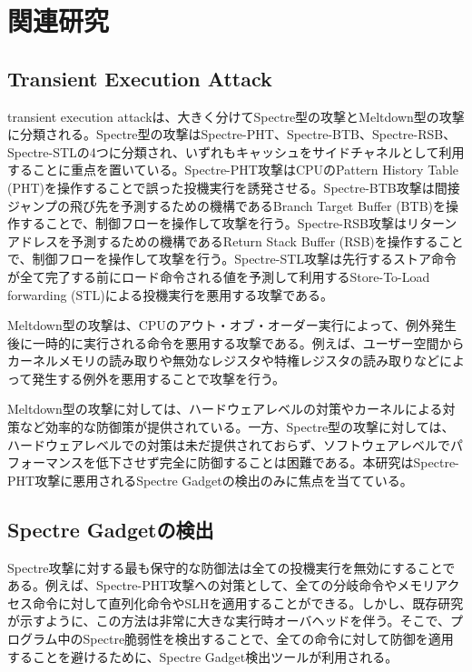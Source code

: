 \section{関連研究}
\subsection{Transient Execution Attack}
transient execution attackは、大きく分けてSpectre型の攻撃とMeltdown型の攻撃に分類される。Spectre型の攻撃はSpectre-PHT\cite{8835233}、Spectre-BTB\cite{8835233}、Spectre-RSB\cite{220586,10.1145/3243734.3243761}、Spectre-STL\cite{Spectre-v4}の4つに分類され、いずれもキャッシュをサイドチャネルとして利用することに重点を置いている。Spectre-PHT攻撃はCPUのPattern History Table (PHT)を操作することで誤った投機実行を誘発させる。Spectre-BTB攻撃は間接ジャンプの飛び先を予測するための機構であるBranch Target Buffer (BTB)を操作することで、制御フローを操作して攻撃を行う。Spectre-RSB攻撃はリターンアドレスを予測するための機構であるReturn Stack Buffer (RSB)を操作することで、制御フローを操作して攻撃を行う。Spectre-STL攻撃は先行するストア命令が全て完了する前にロード命令される値を予測して利用するStore-To-Load forwarding (STL)による投機実行を悪用する攻撃である。\par

Meltdown型の攻撃は、CPUのアウト・オブ・オーダー実行によって、例外発生後に一時的に実行される命令を悪用する攻撃である。例えば、ユーザー空間からカーネルメモリの読み取り\cite{van2018foreshadow,217478,weisse2018foreshadow}や無効なレジスタや特権レジスタの読み取り\cite{intel-meltdown,stecklina2018lazyfp}などによって発生する例外を悪用することで攻撃を行う。\par
Meltdown型の攻撃に対しては、ハードウェアレベルの対策\cite{intel-meltdown-defence}やカーネルによる対策\cite{KAISER}など効率的な防御策が提供されている。一方、Spectre型の攻撃に対しては、ハードウェアレベルでの対策は未だ提供されておらず、ソフトウェアレベルでパフォーマンスを低下させず完全に防御することは困難である。本研究はSpectre-PHT攻撃に悪用されるSpectre Gadgetの検出のみに焦点を当てている。\par

\subsection{Spectre Gadgetの検出}
Spectre攻撃に対する最も保守的な防御法は全ての投機実行を無効にすることである。例えば、Spectre-PHT攻撃への対策として、全ての分岐命令やメモリアクセス命令に対して直列化命令やSLH\cite{LLVM-SLH}を適用することができる。しかし、既存研究\cite{wang2018oo7,oleksenko2020specfuzz}が示すように、この方法は非常に大きな実行時オーバヘッドを伴う。そこで、プログラム中のSpectre脆弱性を検出することで、全ての命令に対して防御を適用することを避けるために、Spectre Gadget検出ツールが利用される。\par

